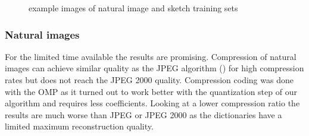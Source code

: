 \begin{figure}[h]
\hspace{5mm}
\hspace{5mm}
\hspace{5mm}
\hspace{5mm}
\caption{example images of natural image and sketch training sets}
\label{fig:database_images}
\end{figure}

\newpage
\subsubsection{Natural images}

For the limited time available the results are promising. Compression of
natural images can achieve similar quality as the JPEG algorithm
() for high compression rates but does not reach the
JPEG 2000 quality. Compression coding was done with the OMP as it turned out to
work better with the quantization step of our algorithm and requires less
coefficients. Looking at a lower compression ratio the results are much worse
than JPEG or JPEG 2000 as the dictionaries have a limited maximum reconstruction
quality.

